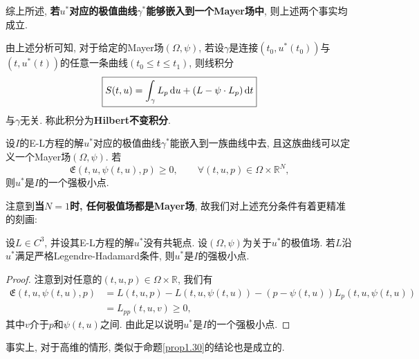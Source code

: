 综上所述, \textbf{若$u^*$对应的极值曲线$\gamma^*$能够嵌入到一个Mayer场中}, 则上述两个事实均成立.

\begin{remark}
    由上述分析可知, 对于给定的Mayer场$(\Omega, \psi)$, 若设$\gamma$是连接$(t_0, u^*(t_0))$与$(t, u^*(t))$的任意一条曲线$(t_0 \leq t \leq t_1)$, 则线积分 
    \begin{equation*}
        \boxed{S(t, u) = \int_{\gamma}L_p \,{\rm d}u + (L - \psi \cdot L_p) \,{\rm d}t}
    \end{equation*}
    与$\gamma$无关. 称此积分为\textbf{Hilbert不变积分}.
\end{remark}

\begin{proposition}
    设$I$的E-L方程的解$u^*$对应的极值曲线$\gamma^*$能嵌入到一族曲线中去, 且这族曲线可以定义一个Mayer场$(\Omega, \psi)$.
    若
    \begin{equation*}
        \mathfrak{E}(t, u, \psi(t, u), p) \geq 0, \qquad \forall (t, u, p) \in \Omega \times \mathbb{R}^N,
    \end{equation*}
    则$u^*$是$I$的一个强极小点.
\end{proposition}

注意到\textbf{当$N = 1$时, 任何极值场都是Mayer场}, 故我们对上述充分条件有着更精准的刻画:

\begin{proposition}[充分条件, $N = 1$]\label{prop1.30}
    设$L \in C^3$, 并设其E-L方程的解$u^*$没有共轭点. 设$(\Omega, \psi)$为关于$u^*$的极值场.
    若$L$沿$u^*$满足严格Legendre-Hadamard条件, 则$u^*$是$I$的强极小点.
    \begin{proof}
        注意到对任意的$(t, u, p) \in \Omega \times \mathbb{R}$, 我们有 
        \begin{align*}
            \mathfrak{E}(t, u, \psi(t, u), p) &= L(t, u, p) - L(t, u, \psi(t, u)) - (p - \psi(t, u))L_p(t, u, \psi(t, u)) \\   
            &= L_{pp}(t, u, v) \geq 0, 
        \end{align*}
        其中$v$介于$p$和$\psi(t, u)$之间. 由此足以说明$u^*$是$I$的一个强极小点.
    \end{proof}
\end{proposition}

事实上, 对于高维的情形, 类似于命题\ref{prop1.30}的结论也是成立的.

